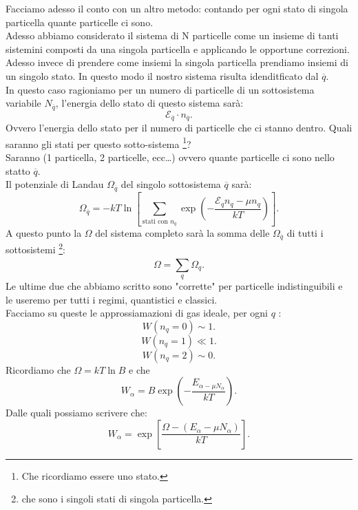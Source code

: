 Facciamo adesso il conto con un altro metodo: contando per ogni stato di singola particella quante particelle ci sono.\\
Adesso abbiamo considerato il sistema di N particelle come un insieme di tanti sistemini composti da una singola particella e applicando le opportune correzioni. Adesso invece di prendere come insiemi la singola particella prendiamo insiemi di un singolo stato. In questo modo il nostro sistema risulta idenditficato dal $\overline{q}$.\\
In questo caso ragioniamo per un numero di particelle di un sottosistema variabile $N_{\overline{q}}$, l'energia dello stato di questo sistema sarà:
\[
	 \mathcal{E}_{\overline{q}}\cdot n_{\overline{q}}
.\] 
Ovvero l'energia dello stato per il numero di particelle che ci stanno dentro. Quali saranno gli stati per questo sotto-sistema \footnote{Che ricordiamo essere uno stato.}?\\
Saranno (1 particella, 2 particelle, ecc\ldots) ovvero quante particelle ci sono nello statto  $\overline{q}$.\\
Il potenziale di Landau $\Omega_{\overline{q}}$ del singolo sottosistema $\overline{q}$ sarà:
\[
	\Omega_{\overline{q}} = - kT 
	\ln \left[ \sum_{\text{stati con $n_{q}$}}^{} \exp\left( -\frac{\mathcal{E}_{q}n_{q}-\mu n_{q}}{kT} \right) 
\right] .\] \label{eq:Landau_gas_ideale}
A questo punto la $\Omega$ del sistema completo sarà la somma delle $\Omega_{\overline{q}}$ di tutti i sottosistemi \footnote{che sono i singoli stati di singola particella.}:
\[
	\Omega = \sum_{q}^{} \Omega_{q}
.\] 
Le ultime due che abbiamo scritto sono "corrette" per particelle indistinguibili e le useremo per tutti i regimi, quantistici e classici.\\ 
Facciamo su queste le approssiamazioni di gas ideale, per ogni $q$ :
\[
	W\left( n_{q}=0 \right) \sim 1 
.\] 
\[
	W\left( n_{q}=1 \right) \ll 1
.\] 
\[
	W\left( n_{q}=2 \right) \sim 0
.\] 
Ricordiamo che $\Omega = kT \ln B$ e che
\[
	W_{\alpha}= B \exp\left( -\frac{E_{\alpha-\mu N_{\alpha}}}{kT} \right) 
.\] 
Dalle quali possiamo scrivere che:
\[
	W_{\alpha} = \exp\left[ \frac{\Omega-\left( E_{\alpha}-\mu N_{\alpha} \right) }{kT} \right] 
.\] 

